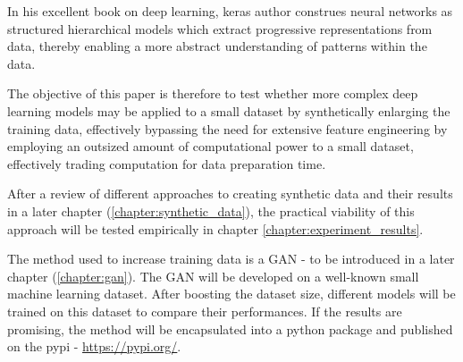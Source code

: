In his excellent book on deep learning, keras author \cite{chollet2017deep} construes neural networks as structured hierarchical models which extract progressive representations from data, thereby enabling a more abstract understanding of patterns within the data.

The objective of this paper is therefore to test whether more complex deep learning models may be applied to a small dataset by synthetically enlarging the training data, effectively bypassing the need for extensive feature engineering by employing an outsized amount of computational power to a small dataset, effectively trading computation for data preparation time.

After a review of different approaches to creating synthetic data and their results in a later chapter (\ref{chapter:synthetic_data}), the practical viability of this approach will be tested empirically in chapter \ref{chapter:experiment_results}.

The method used to increase training data is a \ac{GAN} - to be introduced in a later chapter (\ref{chapter:gan}).
The \ac{GAN} will be developed on a well-known small machine learning dataset. After boosting the dataset size, different models will be trained on this dataset to compare their performances. If the results are promising, the method will be encapsulated into a python package and published on the \ac{pypi} - \url{https://pypi.org/}.
